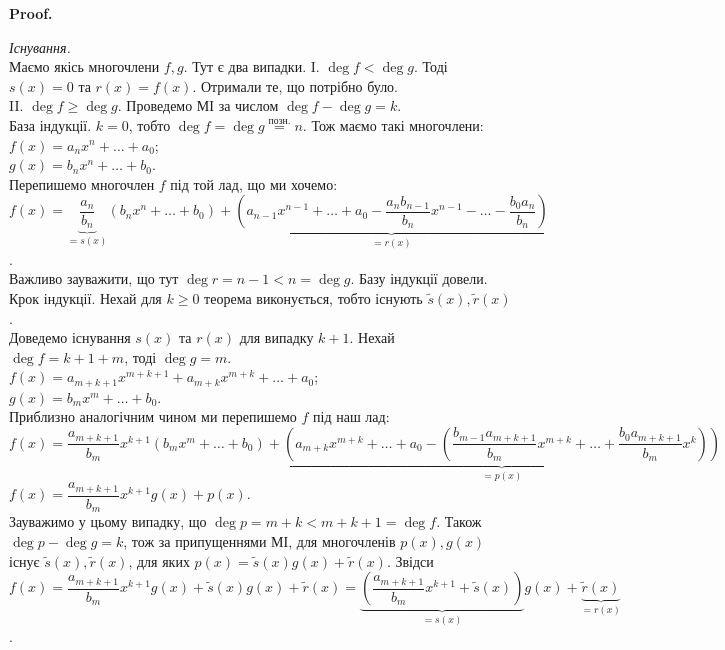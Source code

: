 \documentclass[a4paper, 10pt]{extarticle}
\makeatletter
\def\qed{$\blacksquare$}
\def\qed{$\blacksquare$}
\theoremstyle{theoremdd}
\theoremstyle{theoremdd}
\theoremstyle{theoremdd}
\theoremstyle{theoremdd}
\theoremstyle{theoremdd}
\theoremstyle{theoremdd}
\theoremstyle{theoremdd}
\theoremstyle{theoremdd}
\renewenvironment{proof}[1][Proof.\\]{\par
\pushQED{\hfill \qed}%
\normalfont \topsep6\p@\@plus6\p@\relax
\trivlist
\item\relax
{\bfseries
#1\@addpunct{.}}\hspace\labelsep\ignorespaces
}{%
\popQED\endtrivlist\@endpefalse
}
\makeatother
\begin{document}
\begin{proof}
\textit{Існування.}\\
Маємо якісь многочлени $f,g$. Тут є два випадки.
I. $\deg f < \deg g$. Тоді $s(x) = 0$ та $r(x) = f(x)$. Отримали те, що потрібно було.
\bigskip \\
II. $\deg f \geq \deg g$. Проведемо МІ за числом $\deg f -\deg g = k$.\\
База індукції. $k = 0$, тобто $\deg f = \deg g \overset{\text{позн.}}{=} n$.
Тож маємо такі многочлени:\\
$f(x) = a_n x^n + \dots + a_0$;\\
$g(x) = b_n x^n + \dots + b_0$.\\
Перепишемо многочлен $f$ під той лад, що ми хочемо:\\
$f(x) = \underbrace{\dfrac{a_n}{b_n}}_{=s(x)} (b_n x^n + \dots + b_0) + \underbrace{\left(a_{n-1}x^{n-1}+\dots+a_0 - \dfrac{a_n b_{n-1}}{b_n}x^{n-1}- \dots - \dfrac{b_0 a_n}{b_n} \right)}_{= r(x)}$.\\
Важливо зауважити, що тут $\deg r =n-1 < n = \deg g$. Базу індукції довели.
\bigskip \\
Крок індукції. Нехай для $k \geq 0$ теорема виконується, тобто існують $\tilde{s}(x), \tilde{r}(x)$.
\bigskip \\
Доведемо існування $s(x)$ та $r(x)$ для випадку $k+1$. Нехай $\deg f = k+1+m$, тоді $\deg g = m$.\\
$f(x) = a_{m+k+1} x^{m+k+1} + a_{m+k}x^{m+k} + \dots + a_0$;\\
$g(x) = b_m x^m + \dots + b_0$.\\
Приблизно аналогічним чином ми перепишемо $f$ під наш лад:\\
$f(x) = \dfrac{a_{m+k+1}}{b_m}x^{k+1} (b_m x^m + \dots + b_0)
+ \underbrace{\left(a_{m+k}x^{m+k} + \dots + a_0 - \left(\dfrac{b_{m-1}a_{m+k+1}}{b_m}x^{m+k} + \dots + \dfrac{b_0 a_{m+k+1}}{b_m}x^k \right) \right)}_{=p(x)}$\\
$f(x) = \dfrac{a_{m+k+1}}{b_m}x^{k+1}g(x) + p(x)$.\\
Зауважимо у цьому випадку, що $\deg p = m+k < m+k+1 = \deg f$. Також $\deg p - \deg g = k$, тож за припущеннями МІ, для многочленів $p(x),g(x)$ існує $\tilde{s}(x), \tilde{r}(x)$, для яких $p(x) = \tilde{s}(x) g(x) + \tilde{r}(x)$. Звідси\\
$f(x) = \dfrac{a_{m+k+1}}{b_m}x^{k+1}g(x) + \tilde{s}(x)g(x) + \tilde{r}(x) = \underbrace{\left(\dfrac{a_{m+k+1}}{b_m}x^{k+1} + \tilde{s}(x) \right)}_{=s(x)}g(x) + \underbrace{\tilde{r}(x)}_{=r(x)}$.\\

\end{proof}
\end{document}
